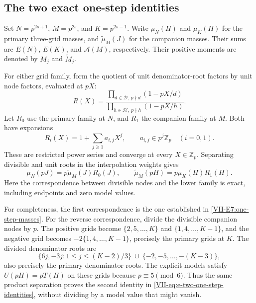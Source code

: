 \documentclass[11pt,letterpaper]{article}
\numberwithin{equation}{section}
\begin{document}
\subsection{The two exact one-step identities}
Set $N=p^{2s+1}$, $M=p^{2s}$, and $K=p^{2s-1}$.
Write $\mu_N(H)$ and $\mu_K(H)$ for the primary three-grid masses,
and $\widetilde\mu_M(J)$ for the companion masses. Their sums are
$E(N)$, $E(K)$, and $\mathcal A(M)$, respectively. Their positive
moments are denoted by $M_j$ and $\widetilde M_j$.

For either grid family, form the quotient of unit denominator-root
factors by unit node factors, evaluated at $pX$:
\[
 R(X)=
 \frac{\prod_{d\in\mathcal D,\ p\nmid d}(1-pX/d)}
      {\prod_{h\in\mathcal H,\ p\nmid h}(1-pX/h)}.
\]
Let $R_0$ use the primary family at $N$, and $R_1$ the companion
family at $M$. Both have expansions
\begin{equation}\label{VII-eq:e-kernel-coefficient-bound}
 R_i(X)=1+\sum_{j\ge1}a_{i,j}X^j,
 \qquad a_{i,j}\in p^j\mathbb Z_p\quad(i=0,1).
\end{equation}
These are restricted power series and converge at every $X\in\mathbb Z_p$.
Separating divisible and unit roots in the interpolation weights gives
\begin{equation}\label{VII-eq:e-two-one-step-identities}
 \mu_N(pJ)=p\widetilde\mu_M(J)R_0(J),\qquad
 \widetilde\mu_M(pH)=p\mu_K(H)R_1(H).
\end{equation}
Here the correspondence between divisible nodes and the lower family
is exact, including endpoints and zero model values.

For completeness, the first correspondence is the one established in
\eqref{VII-E7:one-step-masses}. For the reverse correspondence, divide the
divisible companion nodes by $p$. The positive grids become
$\{2,5,\ldots,K\}$ and $\{1,4,\ldots,K-1\}$, and the negative grid
becomes $-2\{1,4,\ldots,K-1\}$, precisely the primary grids at $K$.
The divided denominator roots are
\[
 \{6j,-3j:1\le j\le(K-2)/3\}
 \ \cup\ \{-2,-5,\ldots,-(K-3)\},
\]
also precisely the primary denominator roots. The explicit models
satisfy $U(pH)=pT(H)$ on these grids because $p\equiv5\pmod6$.
Thus the same product separation proves the second identity in
\eqref{VII-eq:e-two-one-step-identities}, without dividing by a model
value that might vanish.
\end{document}
